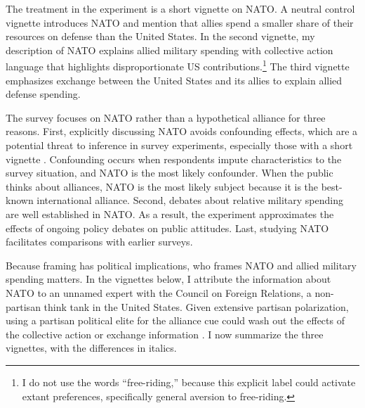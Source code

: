 \documentclass[12pt]{article}
\begin{document}
The treatment in the experiment is a short vignette on NATO. 
A neutral control vignette introduces NATO and mention that allies spend a smaller share of their resources on defense than the United States. 
In the second vignette, my description of NATO explains allied military spending with collective action language that highlights disproportionate US contributions.\footnote{I do not use the words ``free-riding,'' because this explicit label could activate extant preferences, specifically general aversion to free-riding.} 
The third vignette emphasizes exchange between the United States and its allies to explain allied defense spending. 


The survey focuses on NATO rather than a hypothetical alliance for three reasons. 
First, explicitly discussing NATO avoids confounding effects, which are a potential threat to inference in survey experiments, especially those with a short vignette \citep{KrepsRoblin2019}. 
Confounding occurs when respondents impute characteristics to the survey situation, and NATO is the most likely confounder. 
When the public thinks about alliances, NATO is the most likely subject because it is the best-known international alliance.
Second, debates about relative military spending are well established in NATO. 
As a result, the experiment approximates the effects of ongoing policy debates on public attitudes. 
Last, studying NATO facilitates comparisons with earlier surveys.
 

Because framing has political implications, who frames NATO and allied military spending matters. 
In the vignettes below, I attribute the information about NATO to an unnamed expert with the Council on Foreign Relations, a non-partisan think tank in the United States. 
Given extensive partisan polarization, using a partisan political elite for the alliance cue could wash out the effects of the collective action or exchange information \citep{Druckmanetal2013}. 
I now summarize the three vignettes, with the differences in italics. 
 
\end{document}
